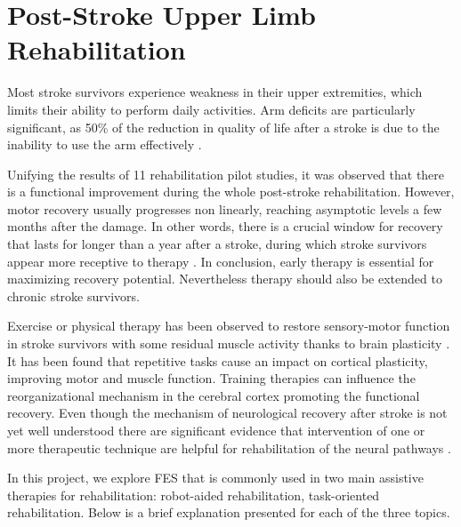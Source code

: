 \section{Post-Stroke Upper Limb Rehabilitation}

Most stroke survivors experience weakness in their upper extremities, which limits their ability to perform daily activities. Arm deficits are particularly significant, as 50\% of the reduction in quality of life after a stroke is due to the inability to use the arm effectively \cite{UEFSS}. 

Unifying the results of 11 rehabilitation pilot studies, it was observed that there is a functional improvement during the whole post-stroke rehabilitation. However, motor recovery usually progresses non linearly, reaching asymptotic levels a few months after the damage. In other words, there is a crucial window for recovery that lasts for longer than a year after a stroke, during which stroke survivors appear more receptive to therapy \cite{Ballester2019}. In conclusion, early therapy is essential for maximizing recovery potential. Nevertheless therapy should also be extended to chronic stroke survivors.

Exercise or physical therapy has been observed to restore sensory-motor function in stroke survivors with some residual muscle activity thanks to brain plasticity \cite{Beekhuizen2005}. It has been found that repetitive tasks cause an impact on cortical plasticity, improving motor and muscle function. Training therapies can influence the reorganizational mechanism in the cerebral cortex promoting the functional recovery. Even though the mechanism of neurological recovery after stroke is not yet well understood there are significant evidence that intervention of one or more therapeutic technique are helpful for rehabilitation of the neural pathways \cite{Masiero2008}.

In this project, we explore FES that is commonly used in two main assistive therapies for rehabilitation: robot-aided rehabilitation, task-oriented rehabilitation. Below is a brief explanation presented for each of the three topics.

